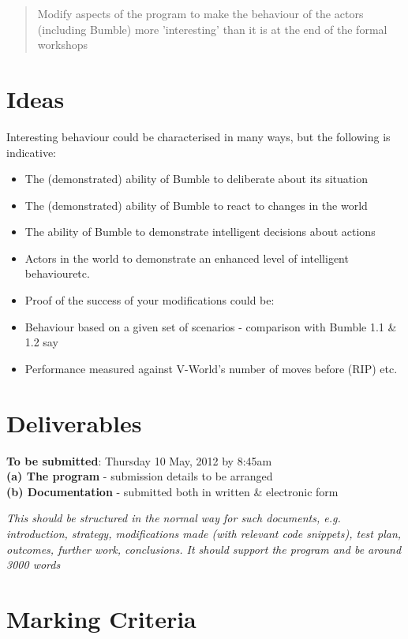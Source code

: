 \documentclass[a4paper,oneside]{report}
\begin{document}
\begin{quotation} Modify aspects of the program to make the behaviour of the actors (including Bumble) more 'interesting' than it is at the end of the formal workshops \end{quotation}

\section{Ideas}

Interesting behaviour could be characterised in many ways, but the following is indicative:

\begin{itemize}
\item The (demonstrated) ability of Bumble to deliberate about its situation
\item The (demonstrated) ability of Bumble to react to changes in the world
\item The ability of Bumble to demonstrate intelligent decisions about actions
\item Actors in the world to demonstrate an enhanced level of intelligent behaviouretc.
\item Proof of the success of your modifications could be:
\item Behaviour based on a given set of scenarios - comparison with Bumble 1.1 \& 1.2 say
\item Performance measured against V-World's number of moves before (RIP)
etc.
\end{itemize}

\section{Deliverables}

\textbf{To be submitted}: Thursday 10 May, 2012 by 8:45am\\

\noindent \textbf{(a) The program} - submission details to be arranged\\
\textbf{(b) Documentation} - submitted both in written \& electronic form

\emph{This should be structured in the normal way for such documents, e.g.  introduction, strategy, modifications made (with relevant code snippets), test plan, outcomes, further work, conclusions. It should support the program and be around 3000 words}

\section{Marking Criteria}
\end{document}
